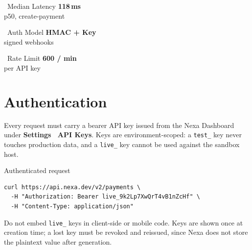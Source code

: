 \documentclass[10pt]{article}
\begin{document}
\vspace{1mm}
\begin{minipage}[t]{0.32\textwidth}
\begin{statbox}{\faClock\ Median Latency}
  \centering
  {\color{nexanavy}\LARGE\bfseries 118\,ms}\\
  \small\color{muted} p50, create-payment
\end{statbox}
\end{minipage}\hfill
\begin{minipage}[t]{0.32\textwidth}
\begin{statbox}{\faLock\ Auth Model}
  \centering
  {\color{nexanavy}\LARGE\bfseries HMAC + Key}\\
  \small\color{muted} signed webhooks
\end{statbox}
\end{minipage}\hfill
\begin{minipage}[t]{0.32\textwidth}
\begin{statbox}{\faBolt\ Rate Limit}
  \centering
  {\color{nexanavy}\LARGE\bfseries 600 / min}\\
  \small\color{muted} per API key
\end{statbox}
\end{minipage}
\par
\vspace{1.5mm}

\section{Authentication}

Every request must carry a bearer API key issued from the Nexa Dashboard under
\textbf{Settings \textrightarrow\ API Keys}. Keys are environment-scoped: a \texttt{test\_}
key never touches production data, and a \texttt{live\_} key cannot be used against the
sandbox host.

\begin{codepanel}{Authenticated request}
\begin{lstlisting}[style=nexabash]
curl https://api.nexa.dev/v2/payments \
  -H "Authorization: Bearer live_9k2Lp7XwQrT4vB1nZcHf" \
  -H "Content-Type: application/json"
\end{lstlisting}
\end{codepanel}

\begin{warnbox}
Do not embed \texttt{live\_} keys in client-side or mobile code. Keys are shown once at
creation time; a lost key must be revoked and reissued, since Nexa does not store the
plaintext value after generation.
\end{warnbox}
\end{document}
